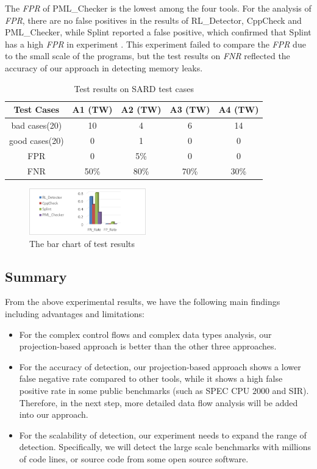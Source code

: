 The \textit{FPR} of PML\_Checker is the lowest among the four tools. For the analysis of \textit{FPR}, there are no false positives in the results of RL\_Detector, CppCheck and PML\_Checker, while Splint reported a false positive, which confirmed that Splint has a high \textit{FPR} in experiment . This experiment failed to compare the \textit{FPR} due to the small scale of the programs, but the test results on \textit{FNR} reflected the accuracy of our approach in detecting memory leaks.

\begin{table}[!h]
\center
\caption{Test results on SARD test cases}\label{tab:7}
\begin{tabular}{|c|c|c|c|c|}
\hline
\textbf{Test Cases} & \textbf{A1} (TW)& \textbf{A2} (TW) & \textbf{A3} (TW) & \textbf{A4} (TW)\\
\hline
bad cases(20) &10 & 4 & 6 & 14\\
\hline
good cases(20) & 0 & 	1 &	0 &	0\\
\hline
FPR & 0& 5\% & 0 & 0\\
\hline
FNR & 50\% & 80\% & 70\% & 30\%\\
\hline
\end{tabular}
\end{table}

\begin{figure}[!h]
\center
\includegraphics[width=0.45\textwidth]{figure/fig8-fig12/fig12}
\caption{The bar chart of test results}
\label{fig:12}
\end{figure}

\subsection{Summary}
From the above experimental results, we have the following main findings including advantages and limitations: 
\begin{itemize}
\item 
For the complex control flows and complex data types analysis, our projection-based approach is better than the other three approaches.
\item 
For the accuracy of detection, our projection-based approach shows a lower false negative rate compared to other tools, while it shows a high false positive rate in some public benchmarks (such as SPEC CPU $2000$ and SIR). Therefore, in the next step, more detailed data flow analysis will be added into our approach.
\item 
For the scalability of detection, our experiment needs to expand the range of detection. Specifically, we will detect the large scale benchmarks with millions of code lines, or source code from some open source software.
\end{itemize}
